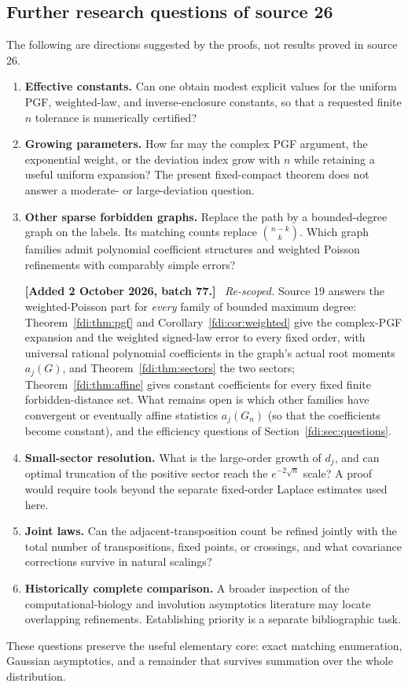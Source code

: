 \documentclass[11pt,letterpaper]{article}
\theoremstyle{remark}\newtheorem{remark}[theorem]{Remark}
\newenvironment{mergenote}[1][2 October 2026, batch 77]{\par\smallskip\begingroup\small\noindent\textbf{[Added #1.]}\ }{\endgroup\par\smallskip}
\begin{document}
\subsection{Further research questions of source 26}\label{fdi:adj:sec:questions}
The following are directions suggested by the proofs, not results proved in source 26.
\begin{enumerate}
 \item \textbf{Effective constants.} Can one obtain modest explicit values for the uniform PGF, weighted-law, and inverse-enclosure constants, so that a requested finite $n$ tolerance is numerically certified?
 \item \textbf{Growing parameters.} How far may the complex PGF argument, the exponential weight, or the deviation index grow with $n$ while retaining a useful uniform expansion? The present fixed-compact theorem does not answer a moderate- or large-deviation question.
 \item \textbf{Other sparse forbidden graphs.} Replace the path by a bounded-degree graph on the labels. Its matching counts replace $\binom{n-k}{k}$. Which graph families admit polynomial coefficient structures and weighted Poisson refinements with comparably simple errors?

 \begin{mergenote}
 \emph{Re-scoped.} Source 19 answers the weighted-Poisson part for \emph{every} family of bounded maximum degree: Theorem~\ref{fdi:thm:pgf} and Corollary~\ref{fdi:cor:weighted} give the complex-PGF expansion and the weighted signed-law error to every fixed order, with universal rational polynomial coefficients in the graph's actual root moments $a_j(G)$, and Theorem~\ref{fdi:thm:sectors} the two sectors; Theorem~\ref{fdi:thm:affine} gives constant coefficients for every fixed finite forbidden-distance set. What remains open is which other families have convergent or eventually affine statistics $a_j(G_n)$ (so that the coefficients become constant), and the efficiency questions of Section~\ref{fdi:sec:questions}.
 \end{mergenote}
 \item \textbf{Small-sector resolution.} What is the large-order growth of $d_j$, and can optimal truncation of the positive sector reach the $e^{-2\sqrt n}$ scale? A proof would require tools beyond the separate fixed-order Laplace estimates used here.
 \item \textbf{Joint laws.} Can the adjacent-transposition count be refined jointly with the total number of transpositions, fixed points, or crossings, and what covariance corrections survive in natural scalings?
 \item \textbf{Historically complete comparison.} A broader inspection of the computational-biology and involution asymptotics literature may locate overlapping refinements. Establishing priority is a separate bibliographic task.
\end{enumerate}
These questions preserve the useful elementary core: exact matching enumeration, Gaussian asymptotics, and a remainder that survives summation over the whole distribution.
\end{document}
